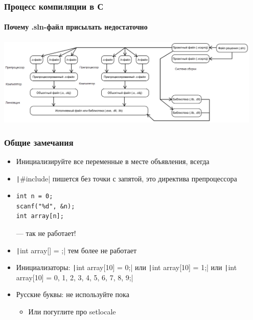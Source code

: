 \documentclass{../../slides-style}
\begin{document}
    
    \begin{frame}[plain]
        \titlepage
    \end{frame}
    
    \begin{frame}
        \frametitle{Процесс компиляции в С}
        \framesubtitle{Почему .sln-файл присылать недостаточно}
        \begin{center}
            \includegraphics[width=0.95\textwidth]{compilation.png}
        \end{center}
    \end{frame}

    \begin{frame}[fragile]
        \frametitle{Общие замечания}
        \begin{itemize}
            \item Инициализируйте все переменные в месте объявления, всегда
            \item \texttt|#include| пишется без точки с запятой, это директива препроцессора
            \item 
            \begin{verbatim}
int n = 0;
scanf("%d", &n);
int array[n];
            \end{verbatim}
            --- так не работает!
            \item \texttt|int array[] = {};| тем более не работает
            \item Инициализаторы: \texttt|int array[10] = {0};| или \texttt|int array[10] = {1};| или \texttt|int array[10] = {0, 1, 2, 3, 4, 5, 6, 7, 8, 9};|
            \item Русские буквы: не используйте пока
            \begin{itemize}
                \item Или погуглите про setlocale
            \end{itemize}
        \end{itemize}
    \end{frame}
\end{document}
